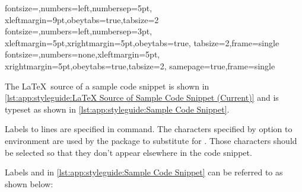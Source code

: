 \begin{VerbatimU}
%
  {fontsize=\scriptsize,numbers=left,numbersep=5pt,%
    xleftmargin=9pt,obeytabs=true,tabsize=2}
%
  {fontsize=\scriptsize,numbers=left,numbersep=3pt,%
    xleftmargin=5pt,xrightmargin=5pt,obeytabs=true,%
    tabsize=2,frame=single}
%
  {fontsize=\scriptsize,numbers=none,xleftmargin=5pt,%
    xrightmargin=5pt,obeytabs=true,tabsize=2,%
    samepage=true,frame=single}
\end{VerbatimU}


\begin{listing}
\begin{fcvlabel}
\end{fcvlabel}
\vspace*{-9pt}
\caption{\LaTeX\ Source of Sample Code Snippet (Current)}
\label{lst:app:styleguide:LaTeX Source of Sample Code Snippet (Current)}
\end{listing}



The \LaTeX\ source of a sample code snippet is shown in
\cref{lst:app:styleguide:LaTeX Source of Sample Code Snippet (Current)}
and is typeset as shown in
\cref{lst:app:styleguide:Sample Code Snippet}.

Labels to lines are specified in  command.
The characters specified by  option to 
environment are used by the  package to substitute
\qco{\\lnlbl\{\}} for .
Those characters should be selected so that they don't appear
elsewhere in the code snippet.

Labels  and  in
\cref{lst:app:styleguide:Sample Code Snippet}
can be referred to as shown below:

